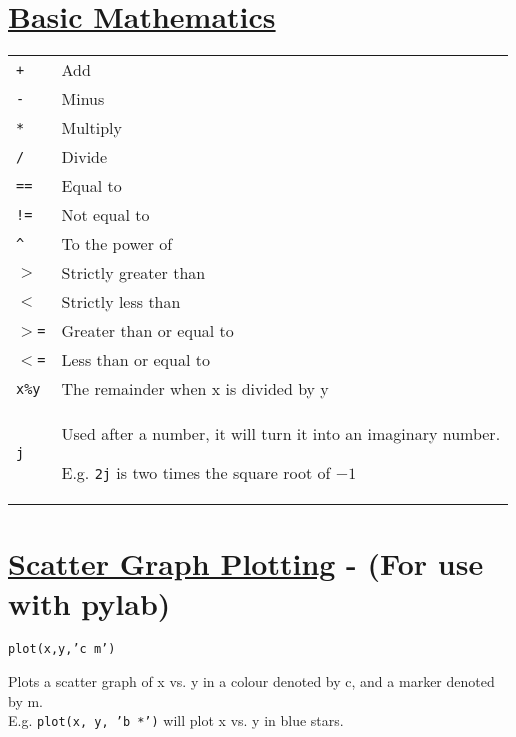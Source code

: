 \section*{\underline{Basic Mathematics}}
\begin{longtable}{l p{11cm}}
\texttt{+}&Add\\[1ex]
\texttt{-}&Minus\\[1ex]
\texttt{*}&Multiply\\[1ex]
\texttt{/}&Divide\\[1ex]
\texttt{==}&Equal to\\[1ex]
\texttt{!=}&Not equal to\\[1ex]
\texttt{\^{}}&To the power of\\[1ex]
\texttt{$>$}&Strictly greater than\\[1ex]
\texttt{$<$}&Strictly less than\\[1ex]
\texttt{$>$=}&Greater than or equal to\\[1ex]
\texttt{$<$=}&Less than or equal to\\[1ex]
\texttt{x\%y}&The remainder when x is divided by y\\[1ex]
\texttt{j}&Used after a number, it will turn it into an imaginary number.

E.g. \texttt{2j} is two times the square root of $-1$\\[1ex]
\end{longtable}

\section*{\underline{Scatter Graph Plotting} - ({\color{red}For use with pylab})}

\noindent \texttt{plot(x,y,'c m')}
\begin{myindentpar}{1.4cm}
\vspace*{-1ex}
Plots a scatter graph of x vs. y in a colour denoted by c, and a marker denoted by m.\\
E.g. \texttt{plot(x, y, 'b *')} will plot x vs. y in blue stars.
\end{myindentpar}

